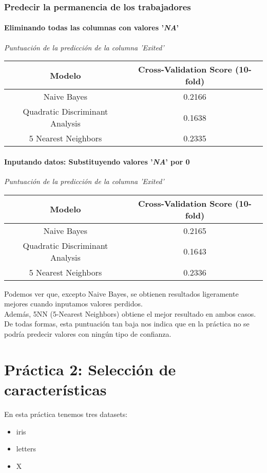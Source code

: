 \documentclass[
12pt, 
spanish, 
singlespacing,
headsepline
]{article}
\begin{document}
\subsubsection{Predecir la permanencia de los trabajadores}
\paragraph{Eliminando todas las columnas con valores '\textit{NA}'}

\begin{center}
\emph{Puntuación de la predicción de la columna 'Exited'}\\
\begin{tabular}{|c|c|}
\hline 
Modelo & Cross-Validation Score (10-fold) \\ 
\hline 
Naive Bayes & 0.2166\\ 
\hline 
Quadratic Discriminant Analysis & 0.1638\\ 
\hline 
5 Nearest Neighbors & 0.2335 \\ 
\hline 
\end{tabular}
\end{center}

\paragraph{Inputando datos: Substituyendo valores '\textit{NA}' por 0}
\begin{center}
\emph{Puntuación de la predicción de la columna 'Exited'}\\
\begin{tabular}{|c|c|}
\hline 
Modelo & Cross-Validation Score (10-fold) \\ 
\hline 
Naive Bayes & 0.2165\\ 
\hline 
Quadratic Discriminant Analysis & 0.1643\\ 
\hline 
5 Nearest Neighbors & 0.2336 \\ 
\hline 
\end{tabular}
\end{center}

Podemos ver que, excepto Naive Bayes, se obtienen resultados ligeramente mejores cuando inputamos valores perdidos.\\
Además, 5NN (5-Nearest Neighbors) obtiene el mejor resultado en ambos casos. De todas formas, esta puntuación tan baja nos indica que en la práctica no se podría predecir valores con ningún tipo de confianza.

\newpage
\section{Práctica 2: Selección de características}
En esta práctica tenemos tres datasets:
\begin{itemize}
\item iris
\item letters
\item X
\end{itemize}
\end{document}

